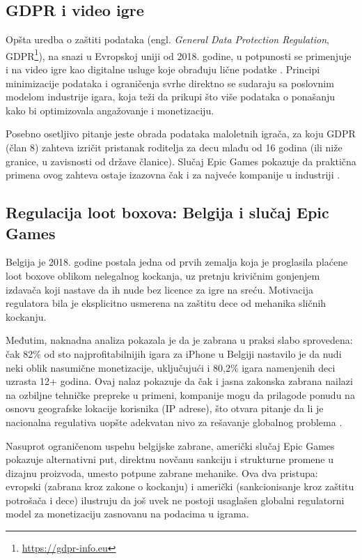\documentclass[12pt]{article}
\begin{document}
\subsection{GDPR i video igre}

Opšta uredba o zaštiti podataka (engl. \textit{General Data Protection Regulation}, GDPR\footnote{\url{https://gdpr-info.eu}}), na snazi u Evropskoj uniji od 2018. godine, u potpunosti se primenjuje i na video igre kao digitalne usluge koje obrađuju lične podatke \cite{gdpr2016}. Principi minimizacije podataka i ograničenja svrhe direktno se sudaraju sa poslovnim modelom industrije igara, koja teži da prikupi što više podataka o ponašanju kako bi optimizovala angažovanje i monetizaciju.

Posebno osetljivo pitanje jeste obrada podataka maloletnih igrača, za koju GDPR (član 8) zahteva izričit pristanak roditelja za decu mlađu od 16 godina (ili niže granice, u zavisnosti od države članice). Slučaj Epic Games pokazuje da praktična primena ovog zahteva ostaje izazovna čak i za najveće kompanije u industriji \cite{ftc2022}.
\subsection{Regulacija loot boxova: Belgija i slučaj Epic Games}

Belgija je 2018. godine postala jedna od prvih zemalja koja je proglasila plaćene loot boxove oblikom nelegalnog kockanja, uz pretnju krivičnim gonjenjem izdavača koji nastave da ih nude bez licence za igre na sreću. Motivacija regulatora bila je eksplicitno usmerena na zaštitu dece od mehanika sličnih kockanju.

Međutim, naknadna analiza pokazala je da je zabrana u praksi slabo sprovedena: čak 82\% od sto najprofitabilnijih igara za iPhone u Belgiji nastavilo je da nudi neki oblik nasumične monetizacije, uključujući i 80,2\% igara namenjenih deci uzrasta 12+ godina. Ovaj nalaz pokazuje da čak i jasna zakonska zabrana nailazi na ozbiljne tehničke prepreke u primeni, kompanije mogu da prilagode ponudu na osnovu geografske lokacije korisnika (IP adrese), što otvara pitanje da li je nacionalna regulativa uopšte adekvatan nivo za rešavanje globalnog problema \cite{xiao2023}.

Nasuprot ograničenom uspehu belgijske zabrane, američki slučaj Epic Games pokazuje alternativni put, direktnu novčanu sankciju i strukturne promene u dizajnu proizvoda, umesto potpune zabrane mehanike. Ova dva pristupa: evropski (zabrana kroz zakone o kockanju) i američki (sankcionisanje kroz zaštitu potrošača i dece) ilustruju da još uvek ne postoji usaglašen globalni regulatorni model za monetizaciju zasnovanu na podacima u igrama.
\end{document}
